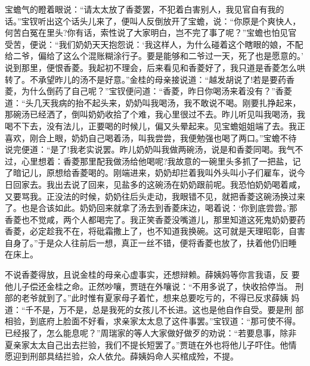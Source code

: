 宝蟾气的瞪着眼说：“请太太放了香菱罢，不犯着白害别人，我见官自有我的
话。”宝钗听出这个话头儿来了，便叫人反倒放开了宝蟾，说：“你原是个爽快人，
何苦白冤在里头?你有话，索性说了大家明白，岂不完了事了呢？”宝蟾也怕见官
受苦，便说：“我们奶奶天天抱怨说：‘我这样人，为什么碰着这个瞎眼的娘，不配
给二爷，偏给了这么个混账糊涂行子。要是能够和二爷过一天，死了也是愿意的。’
说到那里，便恨香菱。我起初不理会，后来看见和香菱好了，我只道是香菱怎么哄
转了。不承望昨儿的汤不是好意。”金桂的母亲接说道：“越发胡说了!若是要药香
菱，为什么倒药了自己呢？”宝钗便问道：“香菱，昨日你喝汤来着没有？”香菱
道：“头几天我病的抬不起头来，奶奶叫我喝汤，我不敢说不喝。刚要扎挣起来，
那碗汤已经洒了，倒叫奶奶收拾了个难，我心里很过不去。昨儿听见叫我喝汤，我
喝不下去，没有法儿，正要喝的时候儿，偏又头晕起来。见宝蟾姐姐端了去。我正
喜欢，刚合上眼，奶奶自己喝着汤，叫我尝尝，我便勉强也喝了两口。”宝蟾不待
说完便道：“是了!我老实说罢。昨儿奶奶叫我做两碗汤，说是和香菱同喝。我气不
过，心里想着：香菱那里配我做汤给他喝呢?我故意的一碗里头多抓了一把盐，记
了暗记儿，原想给香菱喝的。刚端进来，奶奶却拦着我叫外头叫小子们雇车，说今
日回家去。我出去说了回来，见盐多的这碗汤在奶奶跟前呢。我恐怕奶奶喝着咸，
又要骂我。正没法的时候，奶奶往后头走动，我眼错不见，就把香菱这碗汤换过来
了。也是合该如此。奶奶回来就拿了汤去到香菱床边，喝着说：‘你到底尝尝。’那
香菱也不觉咸，两个人都喝完了。我正笑香菱没嘴道儿，那里知道这死鬼奶奶要药
香菱，必定趁我不在，将砒霜撒上了，也不知道我换碗。这可就是天理昭彰，自害
自身了。”于是众人往前后一想，真正一丝不错，便将香菱也放了，扶着他仍旧睡
在床上。

不说香菱得放，且说金桂的母亲心虚事实，还想辩赖。薛姨妈等你言我语，反
要他儿子偿还金桂之命。正然吵嚷，贾琏在外嚷说：“不用多说了，快收拾停当。
刑部的老爷就到了。”此时惟有夏家母子着忙，想来总要吃亏的，不得已反求薛姨
妈道：“千不是，万不是，总是我死的女孩儿不长进。这也是他自作自受。要是刑
部相验，到底府上脸面不好看，求亲家太太息了这件事罢。”宝钗道：“那可使不得。
已经报了，怎么能息呢？”周瑞家的等人大家做好做歹的劝说：“若要息事，除非
夏亲家太太自己出去拦验，我们不提长短罢了。”贾琏在外也将他儿子吓住。他情
愿迎到刑部具结拦验，众人依允。薛姨妈命人买棺成殓，不提。

